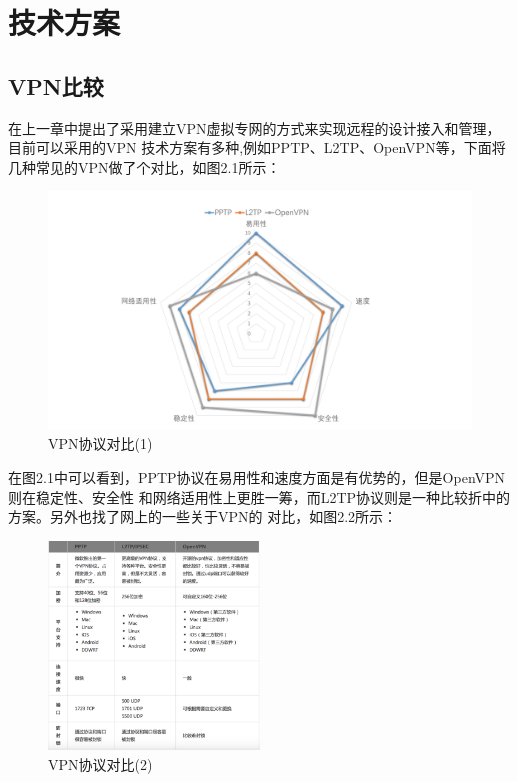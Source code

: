 \documentclass[a4paper,12pt]{report}
\begin{document}
\chapter{技术方案}
\section{VPN比较}
在上一章中提出了采用建立VPN虚拟专网的方式来实现远程的设计接入和管理，目前可以采用的VPN
技术方案有多种,例如PPTP、L2TP、OpenVPN等，下面将几种常见的VPN做了个对比，如图2.1所示：
\begin{figure}[hbtp]
	\centering
	\includegraphics [width=1.0\textwidth]{figure//VPNCompare.pdf}
	\caption{VPN协议对比(1)}\label{VPNCompare}
\end{figure}

在图2.1中可以看到，PPTP协议在易用性和速度方面是有优势的，但是OpenVPN则在稳定性、安全性
和网络适用性上更胜一筹，而L2TP协议则是一种比较折中的方案。另外也找了网上的一些关于VPN的
对比，如图2.2所示：
\begin{figure}[hbtp]
	\centering
	\includegraphics [width=0.5\textwidth]{figure//VPNCompare_01.png}
	\caption{VPN协议对比(2)}\label{VPNCompare_01}
\end{figure}
\end{document}
